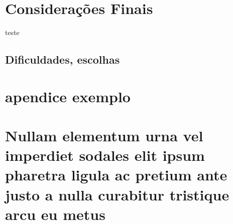 \documentclass[
	12pt,				%
	openany,			%
	twoside,			%
	a4paper,			%
	english,			%
	brazil				%
	]{abntex2}
\begin{document}
\chapter{Considerações Finais}
teste

\section{Dificuldades, escolhas}




\lipsum[24]





\postextual




%
%


\begin{apendicesenv}

\partapendices

\chapter{apendice exemplo}

\lipsum[50]

\chapter{Nullam elementum urna vel imperdiet sodales elit ipsum pharetra ligula
ac pretium ante justo a nulla curabitur tristique arcu eu metus}
\lipsum[55-57]

\end{apendicesenv}
\end{document}
